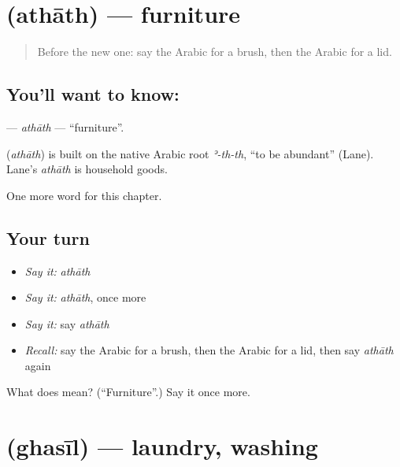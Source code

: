 \section[\texorpdfstring{\ar{أثاث} (athāth)}{أثاث (athāth)}]{ (athāth) — furniture}

\label{lesson:AR-C213-athath}



\begin{quote}
Before the new one: say the Arabic for a brush, then the Arabic for a lid.
\end{quote}

\subsection*{You'll want to know: }
\textbf{} — \emph{athāth} — \textquotedblleft{}furniture\textquotedblright{}.

\begin{cousinweb}
\textbf{} (\emph{athāth}) is built on the native Arabic root \emph{ʾ-th-th}, \textquotedblleft{}to be abundant\textquotedblright{} (Lane). Lane's \emph{athāth} is household goods.
\end{cousinweb}

\begin{grammarlens}[title={What you've built}]
One more word for this chapter.
\end{grammarlens}

\subsection*{Your turn}
\begin{itemize}
\raggedright
  \item \emph{Say it:} \emph{athāth}
  \item \emph{Say it:} \emph{athāth}, once more
  \item \emph{Say it:} say \emph{athāth}
  \item \emph{Recall:} say the Arabic for a brush, then the Arabic for a lid, then say \emph{athāth} again
\end{itemize}

\begin{tcolorbox}[breakable,colback=teal!4,colframe=teal!35!black,title={Before you move on}]
What does  mean? (\textquotedblleft{}Furniture\textquotedblright{}.) Say it once more.
\end{tcolorbox}
\section[\texorpdfstring{\ar{غسيل} (ghasīl)}{غسيل (ghasīl)}]{ (ghasīl) — laundry, washing}

